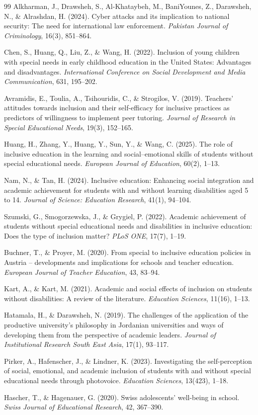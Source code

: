 \documentclass[10pt]{NSP1}
\begin{document}
\begin{thebibliography}{99}
		Alkharman, J., Drawsheh, S., Al-Khataybeh, M., BaniYounes, Z., Darawsheh, N., \& Alrashdan, H. (2024). Cyber attacks and its implication to national security: The need for international law enforcement. \textit{Pakistan Journal of Criminology}, 16(3), 851--864.

		Chen, S., Huang, Q., Liu, Z., \& Wang, H. (2022). Inclusion of young children with special needs in early childhood education in the United States: Advantages and disadvantages. \textit{International Conference on Social Development and Media Communication}, 631, 195--202.

		Avramidis, E., Toulia, A., Tsihouridis, C., \& Strogilos, V. (2019). Teachers' attitudes towards inclusion and their self-efficacy for inclusive practices as predictors of willingness to implement peer tutoring. \textit{Journal of Research in Special Educational Needs}, 19(3), 152--165.

		Huang, H., Zhang, Y., Huang, Y., Sun, Y., \& Wang, C. (2025). The role of inclusive education in the learning and social--emotional skills of students without special educational needs. \textit{European Journal of Education}, 60(2), 1--13.

		Nam, N., \& Tan, H. (2024). Inclusive education: Enhancing social integration and academic achievement for students with and without learning disabilities aged 5 to 14. \textit{Journal of Science: Education Research}, 41(1), 94--104.

		Szumski, G., Smogorzewska, J., \& Grygiel, P. (2022). Academic achievement of students without special educational needs and disabilities in inclusive education: Does the type of inclusion matter? \textit{PLoS ONE}, 17(7), 1--19.

		Buchner, T., \& Proyer, M. (2020). From special to inclusive education policies in Austria -- developments and implications for schools and teacher education. \textit{European Journal of Teacher Education}, 43, 83--94.

		Kart, A., \& Kart, M. (2021). Academic and social effects of inclusion on students without disabilities: A review of the literature. \textit{Education Sciences}, 11(16), 1--13.

		Hatamala, H., \& Darawsheh, N. (2019). The challenges of the application of the productive university's philosophy in Jordanian universities and ways of developing them from the perspective of academic leaders. \textit{Journal of Institutional Research South East Asia}, 17(1), 93--117.

		Pirker, A., Hafenscher, J., \& Lindner, K. (2023). Investigating the self-perception of social, emotional, and academic inclusion of students with and without special educational needs through photovoice. \textit{Education Sciences}, 13(423), 1--18.

		Hascher, T., \& Hagenauer, G. (2020). Swiss adolescents' well-being in school. \textit{Swiss Journal of Educational Research}, 42, 367--390.

	\end{thebibliography}
\end{document}
